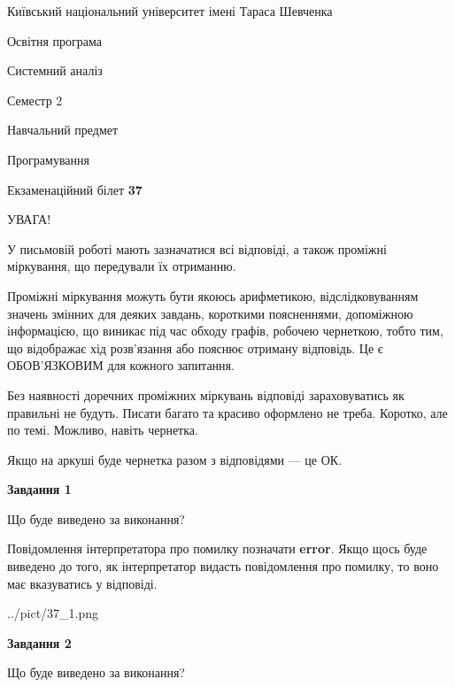 \documentclass[12pt, ukrainian]{article}
\begin{document}
{{\begin {small}\par
{ \center  Київський національний університет імені Тараса Шевченка \par}
{\parbox {5 cm}{Освітня програма \hfill}{\parbox {7 cm}{Системний аналіз \hfill}}\parbox {6 cm}{\hfill Семестр 2}}\par
{\parbox {5 cm} {Навчальний предмет \hfill}\parbox {7 cm}{Програмування \hfill}\parbox {6cm}{\hfill}\par}\vspace{-7pt} \end{small}}{\center Екзаменаційний білет \No \textbf
{ 37 }\par}}
{
\begin {large}
УВАГА!

У письмовій роботі мають зазначатися всі відповіді, а також проміжні міркування, що передували їх отриманню.

Проміжні міркування можуть бути якоюсь арифметикою, відслідковуванням зна\-чень змінних для деяких завдань,
короткими поясненнями, допоміжною інформацією, що виникає під час обходу графів, робочею чернеткою,
тобто тим, що відображає хід розв’язання або пояснює отриману відповідь.
Це є ОБОВ’ЯЗКОВИМ для кожного запитання.

Без наявності доречних проміжних міркувань відповіді зараховуватись як правиль\-ні не будуть.
Писати багато та красиво оформлено не треба. Коротко, але по темі. Можли\-во, навіть чернетка.

Якщо на аркуші буде чернетка разом з відповідями --- це ОК.

\newpage

{\begin {center}\textbf{Завдання 1}\end {center}}\par
Що буде виведено за виконання?

Повідомлення інтерпретатора про помилку позначати \textbf{error}.
Якщо щось буде виведено до того, як інтерпретатор видасть повідомлення про помилку, 
то воно має вказуватись у відповіді. \par


\begin{center}
	{../pict/37_1.png}
\end{center}
\newpage

{\begin {center}\textbf{Завдання 2}\end {center}}\par
Що буде виведено за виконання?


\end{large}}
\end{document}
